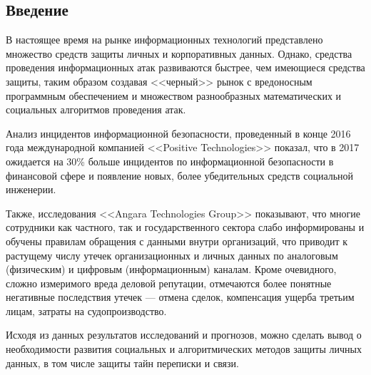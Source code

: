 \newpage
\parindent=1cm %
\begin{center}
	\section*{Введение} %
	\pagestyle{plain} %
	\setcounter{page}{3} %
\end{center}

В настоящее время на рынке информационных технологий представлено множество средств защиты личных и корпоративных данных. Однако, средства проведения информационных атак  развиваются  быстрее, чем имеющиеся средства защиты, таким образом создавая <<черный>>  рынок с вредоносным программным обеспечением  и множеством разнообразных математических и социальных  алгоритмов проведения атак. 

Анализ инцидентов информационной безопасности, проведенный в конце 2016 года международной компанией <<Positive Technologies>> показал, что в 2017 ожидается на 30\% больше инцидентов по информационной безопасности в финансовой сфере и появление новых, более убедительных средств социальной инженерии. %

Также, исследования  <<Angara Technologies Group>> 
показывают, что многие сотрудники  как частного, так и государственного сектора слабо информированы и обучены правилам обращения с данными внутри организаций, что приводит к растущему числу утечек организационных и личных данных по аналоговым (физическим)  и цифровым (информационным) каналам.  Кроме очевидного,  сложно измеримого вреда деловой репутации, отмечаются  более понятные негативные последствия утечек — отмена сделок, компенсация ущерба третьим лицам, затраты на судопроизводство. %

Исходя из данных результатов исследований и прогнозов, можно сделать вывод о необходимости развития социальных  и алгоритмических  методов защиты личных данных, в том числе защиты тайн переписки и  связи.   


